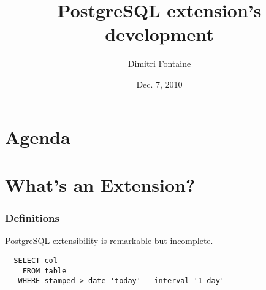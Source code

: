 \documentclass[english]{beamer}
\title{PostgreSQL extension's development}
\author{Dimitri Fontaine}
\date{Dec. 7, 2010}
\begin{document}
\frame{\titlepage}

\section*{Agenda}

\section{What's an Extension?}

\begin{frame}[fragile]
  \frametitle{Definitions}

  \begin{center}
    PostgreSQL extensibility is remarkable but incomplete. 
  \end{center}

\begin{example}
\begin{verbatim}
  SELECT col
    FROM table
   WHERE stamped > date 'today' - interval '1 day'
\end{verbatim}
\end{example}
\end{frame}
\end{document}
